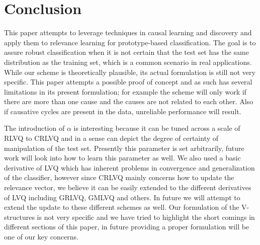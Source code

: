 \documentclass{esannV2}
\begin{document}
\section{Conclusion}
\label{sec:Conclusion}

This paper attempts to leverage techniques in causal learning and discovery and apply them to relevance learning for prototype-based classification. The goal is to assure robust classification when it is not certain that the test set has the same distribution as the training set, which is a common scenario in real applications. While our scheme is theoretically plausible, its actual formulation is still not very specific. This paper attempts a possible proof of concept and as such has several limitations in its present formulation; for example the scheme will only work if there are more than one cause and the causes are not related to each other. Also if causative cycles are present in the data, unreliable performance will result. 

The introduction of $\alpha$ is interesting because it can be tuned across a scale of RLVQ to CRLVQ and in a sense can depict the degree of certainty of manipulation of the test set. Presently this parameter is set arbitrarily, future work will look into how to learn this parameter as well. We also used a basic derivative of LVQ which has inherent problems in convergence and generalization of the classifier, however since CRLVQ mainly concerns how to update the relevance vector, we believe it can be easily extended to the different derivatives of LVQ including GRLVQ, GMLVQ and others. In future we will attempt to extend the update to these different schemes as well. Our formulation of the V-structures is not very specific and we have tried to highlight the short comings in different sections of this paper, in future providing a proper formulation will be one of our key concerns.


\begin{footnotesize}




\end{footnotesize}

\end{document}
